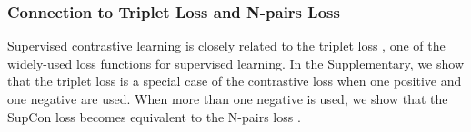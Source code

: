 \subsubsection{Connection to Triplet Loss and N-pairs Loss}
Supervised contrastive learning is closely related to the triplet loss \cite{weinberger2009distance}, one of the widely-used loss functions for supervised learning. In the Supplementary, we show that the triplet loss is a special case of the contrastive loss when one positive and one negative are used. When more than one negative is used, we show that the SupCon loss becomes equivalent to the N-pairs loss \cite{sohn2016improved}.





  
  
  
  
  

















  
  








